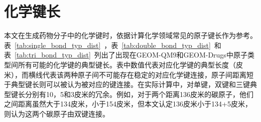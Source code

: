 \cleardoublepage
{

\appendixsecmajornumbering



\section{化学键长}
本文在生成药物分子中的化学键时，依据计算化学领域常见的原子键长作为参考。表~\ref{tab:single_bond_typ_dist}~，表~\ref{tab:double_bond_typ_dist}~和表~\ref{tab:tri_bond_typ_dist}~列出了出现在GEOM-QM9和GEOM-Drugs中原子类型间所有可能的化学键的典型键长。表中数值代表对应化学键的典型长度（皮米），而横线代表该两种原子间不可能存在稳定的对应化学键连接，原子间距离短于典型键长则可以被认为被对应的键连接。在实际计算中，对单键，双键和三键典型键长分别有10，5和3皮米的冗余。例如，对于两个距离136皮米的碳原子，他们之间距离虽然大于134皮米，小于154皮米，但本文认定136皮米小于134+5皮米，则认为这两个碳原子由双键连接。

}
